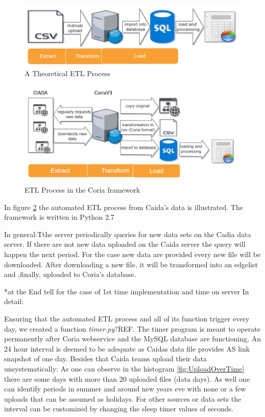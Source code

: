 \documentclass[conference, 11pt]{IEEEtran}
\begin{document}
\begin{figure}[htbp]
\centerline{\includegraphics[scale=0.29]{Graphics/ETL1.PNG}}
\caption{A Theoretical ETL Process}
\label{fig}
\end{figure}



\begin{figure}[htbp]
\centerline{\includegraphics[scale=0.4]{Graphics/ETL2.PNG}}
\caption{ETL Process in the Coria framework}
\label{fig:1}
\end{figure}

In figure \ref{fig:1} the automated ETL process from Caida's data is illustrated. The framework is written in Python 2.7 %

In general:Tthe server periodically queries for new data sets on the Cadia data server. If there are not new data uploaded on the Caida server the query will happen the next period. 
For the case new data are provided every new file will be downloaded. After downloading a new file, it will be transformed into an edgelist and ,finally, uploaded to Coria's database.
\linebreak
\linebreak
 

*at the End tell for the case of 1st time implementation and time on server
In detail:

Ensuring that the automated ETL process and all of its function trigger every day, we created a function \textit{timer.py}?REF. The timer program is meant to operate permanently after Coria webservice and the MySQL database are functioning.
An 24 hour interval is deemed to be adequate as Caida\textsc{}s data file provides AS link snapshot of one day. Besides that Caida teams upload their data unsystematically: As one can observe in the histogram \ref{fig:UploadOverTime} there are some days with more than 20 uploaded files (data days). As well one can identify periods in summer and around new years eve with none or a few uploads that can be assumed as holidays.
For other sources or data sets the interval can be customized by changing the sleep timer values of seconds.
\end{document}
